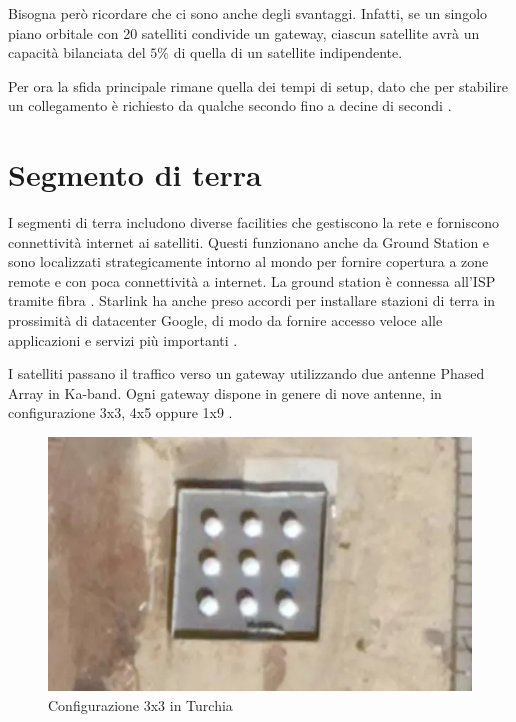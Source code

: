 Bisogna però ricordare che ci sono anche degli svantaggi.
Infatti, se un singolo piano orbitale con 20 satelliti condivide un gateway, ciascun satellite avrà un capacità bilanciata del $5\%$ di quella di un satellite indipendente.

Per ora la sfida principale rimane quella dei tempi di setup, dato che per stabilire un collegamento è richiesto da qualche secondo fino a decine di secondi \cite{chaudhry_laser_2021}.

\section{Segmento di terra}
I segmenti di terra includono diverse facilities che gestiscono la rete e forniscono connettività internet ai satelliti. Questi funzionano anche da Ground Station e sono localizzati strategicamente intorno al mondo per fornire copertura a zone remote e con poca connettività a internet.
La ground station è connessa all'\ac{ISP} tramite fibra \cite{branch_education_how_2022}.
Starlink ha anche preso accordi per installare stazioni di terra in prossimità di datacenter Google, di modo da fornire accesso veloce alle applicazioni e servizi più importanti \cite{jason_rainbow_starlink_2021}.

I satelliti passano il traffico verso un gateway utilizzando due antenne Phased Array in \ac{Ka}-band. Ogni gateway dispone in genere di nove antenne, in configurazione 3x3, 4x5 oppure 1x9 \cite{mike_puchol_modeling_2022}.

\begin{figure}[htbp]
  \centering
  \includegraphics[width=0.9\linewidth]{./res/img/starlink_gateway.png}
  \caption{Configurazione 3x3 in Turchia \cite{mike_puchol_modeling_2022}}
  \label{fig:starlink-gateway}
\end{figure}

